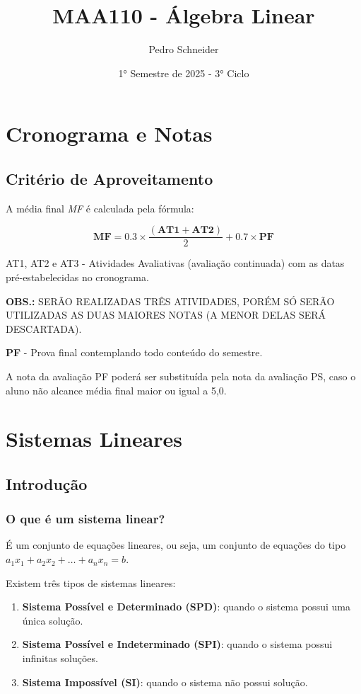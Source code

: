 \documentclass[12pt]{article}
\title{MAA110 - Álgebra Linear}
\author{Pedro Schneider}
\date{1° Semestre de 2025 - 3° Ciclo}
\begin{document}
\maketitle

\tableofcontents

\pagebreak

\section{Cronograma e Notas}

\subsection{Critério de Aproveitamento}
A média final \textit{MF} é calculada pela fórmula:

\begin{center}
    \[
    \bm{MF} = 0.3 \times \frac{(\bm{AT1} + \bm{AT2})}{2} + 0.7 \times \bm{PF}
    \]
\end{center}

\noindent
AT1, AT2 e AT3 - Atividades Avaliativas (avaliação continuada) com as datas pré-estabelecidas no cronograma.

\noindent
\textbf{OBS.:} SERÃO REALIZADAS TRÊS ATIVIDADES, PORÉM SÓ SERÃO UTILIZADAS AS DUAS MAIORES NOTAS (A MENOR DELAS SERÁ DESCARTADA).

\noindent
\break \textbf{PF} - Prova final contemplando todo conteúdo do semestre.

\noindent
A nota da avaliação PF poderá ser substituída pela nota da avaliação PS, caso o aluno não alcance média final maior ou igual a 5,0.

\section{Sistemas Lineares}
\subsection{Introdução}
\subsubsection{O que é um sistema linear?}
É um conjunto de equações lineares, ou seja, um conjunto de equações do tipo $a_1x_1 + a_2x_2 + \ldots + a_nx_n = b$.

Existem três tipos de sistemas lineares:
\begin{enumerate}
    \item \textbf{Sistema Possível e Determinado (SPD)}: quando o sistema possui uma única solução.
    \item \textbf{Sistema Possível e Indeterminado (SPI)}: quando o sistema possui infinitas soluções.
    \item \textbf{Sistema Impossível (SI)}: quando o sistema não possui solução.
\end{enumerate}
\end{document}
